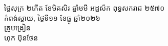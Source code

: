 \documentclass[a4paper,10pt]{article}
\begin{document}
\vspace{6pt}

\begin{flushright}
  \begin{minipage}{8.6cm}
    \centering
    ថ្ងៃសុក្រ ២កើត ខែមិគសិរ ឆ្នាំមមី អដ្ឋស័ក ពុទ្ធសករាជ ២៥៧០\\
    កំពង់ស្វាយ, ថ្ងៃទី១១ ខែធ្នូ ឆ្នាំ២០២៦\\[4pt]
    {\muol គ្រូបង្រៀន}\\[32pt]
    \hfill{\muol ហុក ប៊ុនថែន}\hspace*{1.4cm}
  \end{minipage}
\end{flushright}
\end{document}
